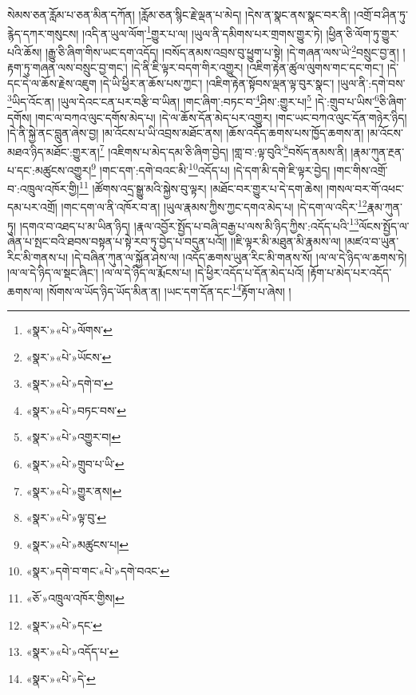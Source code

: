 སེམས་ཅན་རློམ་པ་ཅན་མིན་དཀོན། །རློམ་ཅན་སྙིང་རྗེ་ལྡན་པ་མེད། །དེས་ན་སྣང་ནས་སྣང་བར་ནི། །འགྲོ་བ་ཤིན་ཏུ་རྙེད་དཀར་གསུངས། །འདི་ན་ཡུལ་ལོག་\footnote{«སྣར་»«པེ་»ལོགས་}གྱུར་པ་ལ། །ཡུལ་ནི་དམིགས་པར་གྲགས་གྱུར་ཏེ། །ཕྱིན་ཅི་ལོག་ཏུ་གྱུར་པའི་ཆོས། །རྒྱུ་ཅི་ཞིག་གིས་ཡང་དག་འདོད། །བསོད་ནམས་འབྲས་བུ་ཕྱུག་པ་སྟེ། །དེ་གཞན་ལས་ཡེ་\footnote{«སྣར་»«པེ་»ཡོངས་}བསྲུང་བྱ་ན། །རྟག་ཏུ་གཞན་ལས་བསྲུང་བྱ་གང་། །དེ་ནི་ཇི་ལྟར་བདག་གིར་འགྱུར། །འཇིག་རྟེན་ཚུལ་ལུགས་གང་དང་གང་། །དེ་དང་དེ་ལ་ཆོས་རྗེས་འཇུག །དེ་ཡི་ཕྱིར་ན་ཆོས་པས་ཀྱང་། །འཇིག་རྟེན་སྟོབས་ལྡན་ལྟ་བུར་སྣང་། །ཡུལ་ནི་:དགེ་བས་\footnote{«སྣར་»«པེ་»དགེ་བ་}ཡིད་འོང་ན། །ཡུལ་དེའང་ངན་པར་བརྩི་བ་ཡིན། །གང་ཞིག་:བཏང་བ་\footnote{«སྣར་»«པེ་»བཏང་བས་}ཤིས་:གྱུར་པ།\footnote{«སྣར་»«པེ་»འགྱུར་བ།} །དེ་:གྲུབ་པ་ཡིས་\footnote{«སྣར་»«པེ་»གྲུབ་པ་ཡི་}ཅི་ཞིག་དགོས། །གང་ལ་བཀའ་ལུང་དགོས་མེད་པ། །དེ་ལ་ཆོས་དོན་མེད་པར་འགྱུར། །གང་ཡང་བཀའ་ལུང་དོན་གཉེར་ཉིད། །དེ་ནི་སྐྱེ་ནང་བླུན་ཞེས་བྱ། །མ་འོངས་པ་ཡི་འབྲས་མཐོང་ནས། །ཆོས་འདོད་ཆགས་པས་ཁྱོད་ཆགས་ན། །མ་འོངས་མཐའ་ཉིད་མཐོང་:གྱུར་ན།\footnote{«སྣར་»«པེ་»གྱུར་ནས།} །འཇིགས་པ་མེད་དམ་ཅི་ཞིག་བྱེད། །གླ་བ་:ལྟ་བུའི་\footnote{«སྣར་»«པེ་»ལྟ་བུ་}བསོད་ནམས་ནི། །རྣམ་ཀུན་རྔན་པ་དང་:མཚུངས་འགྱུར།\footnote{«སྣར་»«པེ་»མཚུངས་པ།} །གང་དག་:དགེ་བའང་མི་\footnote{«སྣར་»དགེ་བ་གང་«པེ་»དགེ་བའང་}འདོད་པ། །དེ་དག་མི་དགེ་ཇི་ལྟར་བྱེད། །གང་གིས་འགྲོ་བ་:འཁྲུལ་འཁོར་གྱི།\footnote{«ཅོ་»འཁྲུལ་འཁོར་གྱིས།} །ཚོགས་འདྲ་སྒྱུ་མའི་སྐྱེས་བུ་ལྟར། །མཐོང་བར་གྱུར་པ་དེ་དག་ཆེས། །གསལ་བར་གོ་འཕང་དམ་པར་འགྲོ། །གང་དག་ལ་ནི་འཁོར་བ་ན། །ཡུལ་རྣམས་ཀྱིས་ཀྱང་དགའ་མེད་པ། །དེ་དག་ལ་འདིར་\footnote{«སྣར་»«པེ་»དང་}རྣམ་ཀུན་ཏུ། །དགའ་བ་འཐད་པ་མ་ཡིན་ཉིད། །རྣལ་འབྱོར་སྤྱོད་པ་བཞི་བརྒྱ་པ་ལས་མི་ཉིད་ཀྱིས་:འདོད་པའི་\footnote{«སྣར་»«པེ་»འདོད་པ་}ལོངས་སྤྱོད་ལ་ཞེན་པ་སྤང་བའི་ཐབས་བསྟན་པ་སྟེ་རབ་ཏུ་བྱེད་པ་བདུན་པའོ།། །།ཇི་ལྟར་མི་མཐུན་མི་རྣམས་ལ། །མཛའ་བ་ཡུན་རིང་མི་གནས་པ། །དེ་བཞིན་ཀུན་ལ་སྐྱོན་ཤེས་ལ། །འདོད་ཆགས་ཡུན་རིང་མི་གནས་སོ། །ལ་ལ་དེ་ཉིད་ལ་ཆགས་ཏེ། །ལ་ལ་དེ་ཉིད་ལ་སྡང་ཞིང་། །ལ་ལ་དེ་ཉིད་ལ་རྨོངས་པ། །དེ་ཕྱིར་འདོད་པ་དོན་མེད་པའོ། །རྟོག་པ་མེད་པར་འདོད་ཆགས་ལ། །སོགས་ལ་ཡོད་ཉིད་ཡོད་མིན་ན། །ཡང་དག་དོན་དང་\footnote{«སྣར་»«པེ་»དེ་}རྟོག་པ་ཞེས། །
